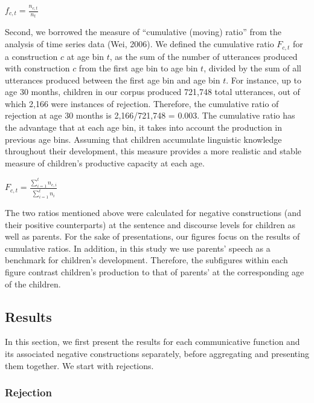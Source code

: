 \documentclass[
  man,floatsintext]{apa6}
\begin{document}
\(f_{c, t} = \frac{n_{c,t}}{n_{t}}\)

Second, we borrowed the measure of ``cumulative (moving) ratio'' from the analysis of time series data (Wei, 2006). We defined the cumulative ratio \(F_{c,t}\) for a construction \(c\) at age bin \(t\), as the sum of the number of utterances produced with construction \(c\) from the first age bin to age bin \(t\), divided by the sum of all utterances produced between the first age bin and age bin \(t\). For instance, up to age 30 months, children in our corpus produced 721,748 total utterances, out of which 2,166 were instances of rejection. Therefore, the cumulative ratio of rejection at age 30 months is 2,166/721,748 = 0.003. The cumulative ratio has the advantage that at each age bin, it takes into account the production in previous age bins. Assuming that children accumulate linguistic knowledge throughout their development, this measure provides a more realistic and stable measure of children's productive capacity at each age.

\(F_{c, t} = \frac{\sum_{i=1}^{t} n_{c,i}}{\sum_{i=1}^{t} n_{i}}\)

The two ratios mentioned above were calculated for negative constructions (and their positive counterparts) at the sentence and discourse levels for children as well as parents. For the sake of presentations, our figures focus on the results of cumulative ratios. In addition, in this study we use parents' speech as a benchmark for children's development. Therefore, the subfigures within each figure contrast children's production to that of parents' at the corresponding age of the children.

\hypertarget{results}{%
\subsection{Results}\label{results}}

In this section, we first present the results for each communicative function and its associated negative constructions separately, before aggregating and presenting them together. We start with rejections.

\hypertarget{rejection}{%
\subsubsection{Rejection}\label{rejection}}
\end{document}
